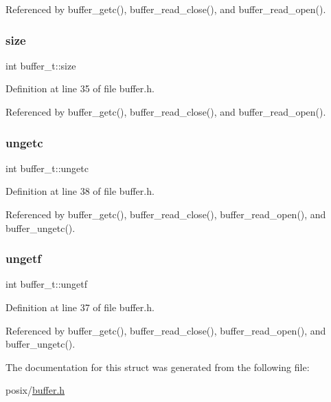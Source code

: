 Referenced by buffer\+\_\+getc(), buffer\+\_\+read\+\_\+close(), and buffer\+\_\+read\+\_\+open().

\mbox{\label{structbuffer__t_a34e81d898c6accf4f06ed9c1133d6361}} 
\subsubsection{\texorpdfstring{size}{size}}
{\footnotesize\ttfamily int buffer\+\_\+t\+::size}



Definition at line 35 of file buffer.\+h.



Referenced by buffer\+\_\+getc(), buffer\+\_\+read\+\_\+close(), and buffer\+\_\+read\+\_\+open().

\mbox{\label{structbuffer__t_aa1fbbf42ce5d6278b21a93647bef3ff1}} 
\subsubsection{\texorpdfstring{ungetc}{ungetc}}
{\footnotesize\ttfamily int buffer\+\_\+t\+::ungetc}



Definition at line 38 of file buffer.\+h.



Referenced by buffer\+\_\+getc(), buffer\+\_\+read\+\_\+close(), buffer\+\_\+read\+\_\+open(), and buffer\+\_\+ungetc().

\mbox{\label{structbuffer__t_a67c2edddeca1858c670ff57e049a9e0e}} 
\subsubsection{\texorpdfstring{ungetf}{ungetf}}
{\footnotesize\ttfamily int buffer\+\_\+t\+::ungetf}



Definition at line 37 of file buffer.\+h.



Referenced by buffer\+\_\+getc(), buffer\+\_\+read\+\_\+close(), buffer\+\_\+read\+\_\+open(), and buffer\+\_\+ungetc().



The documentation for this struct was generated from the following file\+:\begin{DoxyCompactItemize}
\item 
posix/\hyperlink{buffer_8h}{buffer.\+h}\end{DoxyCompactItemize}
